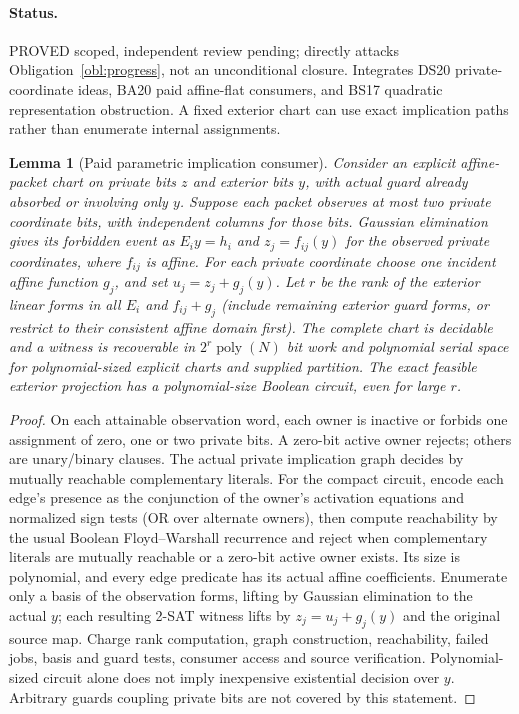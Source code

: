 \documentclass[11pt]{article}
\newtheorem{lemma}[theorem]{Lemma}
\begin{document}
\paragraph{Status.} PROVED scoped, independent review pending; directly attacks Obligation~\ref{obl:progress}, not an unconditional closure. Integrates DS20 private-coordinate ideas, BA20 paid affine-flat consumers, and BS17 quadratic representation obstruction. A fixed exterior chart can use exact implication paths rather than enumerate internal assignments.
\begin{lemma}[Paid parametric implication consumer]\label{lem:bs20-param}
Consider an explicit affine-packet chart on private bits $z$ and exterior bits $y$, with actual guard already absorbed or involving only $y$. Suppose each packet observes at most two private coordinate bits, with independent columns for those bits. Gaussian elimination gives its forbidden event as $E_i y=h_i$ and $z_j=f_{ij}(y)$ for the observed private coordinates, where $f_{ij}$ is affine. For each private coordinate choose one incident affine function $g_j$, and set $u_j=z_j+g_j(y)$. Let $r$ be the rank of the exterior linear forms in all $E_i$ and $f_{ij}+g_j$ (include remaining exterior guard forms, or restrict to their consistent affine domain first). The complete chart is decidable and a witness is recoverable in $2^r\operatorname{poly}(N)$ bit work and polynomial serial space for polynomial-sized explicit charts and supplied partition. The exact feasible exterior projection has a polynomial-size Boolean circuit, even for large $r$.
\end{lemma}
\begin{proof}
On each attainable observation word, each owner is inactive or forbids one assignment of zero, one or two private bits. A zero-bit active owner rejects; others are unary/binary clauses. The actual private implication graph decides by mutually reachable complementary literals. For the compact circuit, encode each edge's presence as the conjunction of the owner's activation equations and normalized sign tests (OR over alternate owners), then compute reachability by the usual Boolean Floyd--Warshall recurrence and reject when complementary literals are mutually reachable or a zero-bit active owner exists. Its size is polynomial, and every edge predicate has its actual affine coefficients. Enumerate only a basis of the observation forms, lifting by Gaussian elimination to the actual $y$; each resulting 2-SAT witness lifts by $z_j=u_j+g_j(y)$ and the original source map. Charge rank computation, graph construction, reachability, failed jobs, basis and guard tests, consumer access and source verification. Polynomial-sized circuit alone does not imply inexpensive existential decision over $y$. Arbitrary guards coupling private bits are not covered by this statement.
\end{proof}
\end{document}
